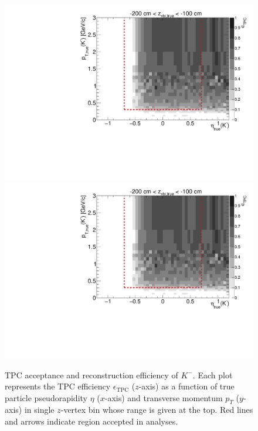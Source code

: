 \begin{figure}[hb]
\caption[TPC acceptance and reconstruction efficiency of $K^{-}$.]{TPC acceptance and reconstruction efficiency of $K^{-}$. Each plot represents the TPC efficiency $\epsilon_{\text{TPC}}$ ($z$-axis) as a function of true particle pseudorapidity $\eta$ ($x$-axis) and transverse momentum $p_{T}$ ($y$-axis) in single $z$-vertex bin whose range is given at the top. Red lines and arrows indicate region accepted in analyses.}\label{fig:tpcEff_kaon_minus}
\centering
\parbox{0.495\textwidth}{
  \centering
  \includegraphics[width=\linewidth,page=3]{graphics/eff/Eff2D_TPC_kaon_Minus.pdf}\\
  \includegraphics[width=\linewidth,page=5]{graphics/eff/Eff2D_TPC_kaon_Minus.pdf}\\
}
\end{figure}
